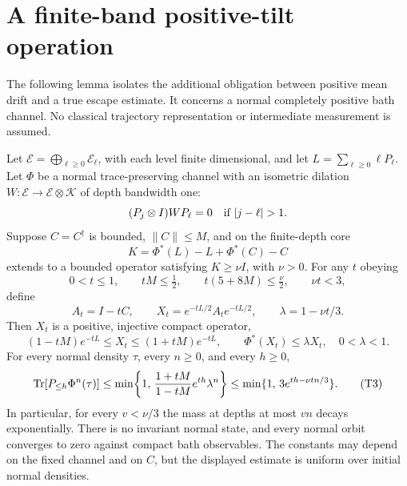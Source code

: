 \section{A finite-band positive-tilt operation}\label{sec:tilt}

The following lemma isolates the additional obligation between positive mean
drift and a true escape estimate. It concerns a normal completely positive bath
channel. No classical trajectory representation or intermediate measurement is
assumed.

\begin{lemma}
\label{lem:tilt}
Let $\mathcal E=\bigoplus_{\ell\ge0}\mathcal E_\ell$, with each level finite
dimensional, and let $L=\sum_{\ell\ge0}\ell P_\ell$. Let $\Phi$ be a normal
trace-preserving channel with an isometric dilation
$W:\mathcal E\to\mathcal E\otimes\mathcal K$ of depth bandwidth one:
\[
 (P_j\otimes I)WP_\ell=0\quad\hbox{if }|j-\ell|>1.
\]
Suppose $C=C^\dagger$ is bounded, $\|C\|\le M$, and on the finite-depth core
\[
 K=\Phi^*(L)-L+\Phi^*(C)-C
\]
extends to a bounded operator satisfying $K\ge\nu I$, with $\nu>0$.
For any $t$ obeying
\[
 0<t\le1,\qquad tM\le\tfrac12,\qquad
 t(5+8M)\le\tfrac{\nu}{2},\qquad \nu t<3,
 \tag{T1}
\]
define
\[
 A_t=I-tC,\qquad X_t=e^{-tL/2}A_te^{-tL/2},
 \qquad \lambda=1-\nu t/3.
\]
Then $X_t$ is a positive, injective compact operator,
\[
 (1-tM)e^{-tL}\le X_t\le(1+tM)e^{-tL},
 \qquad \Phi^*(X_t)\le\lambda X_t,\quad 0<\lambda<1.
 \tag{T2}
\]
For every normal density $\tau$, every $n\ge0$, and every $h\ge0$,
\[
 \operatorname{Tr}[P_{\le h}\Phi^n(\tau)]
 \le \min\!\left\{1,\,
 \frac{1+tM}{1-tM}e^{th}\lambda^n\right\}
 \le \min\{1,\,3e^{th-\nu tn/3}\}.
 \tag{T3}
\]
In particular, for every $v<\nu/3$ the mass at depths at most $vn$
decays exponentially. There is no invariant normal state, and every normal
orbit converges to zero against compact bath observables. The constants may
depend on the fixed channel and on $C$, but the displayed estimate is uniform
over initial normal densities.
\end{lemma}


